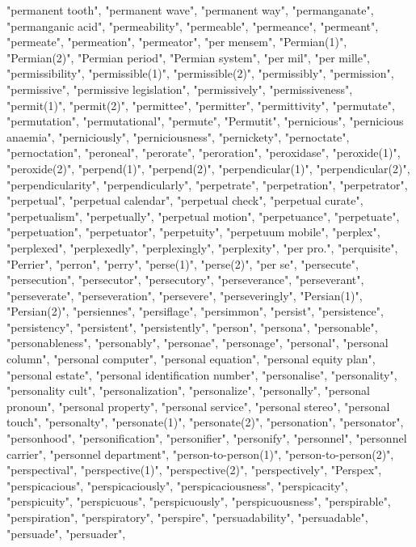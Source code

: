 "permanent tooth",
"permanent wave",
"permanent way",
"permanganate",
"permanganic acid",
"permeability",
"permeable",
"permeance",
"permeant",
"permeate",
"permeation",
"permeator",
"per mensem",
"Permian(1)",
"Permian(2)",
"Permian period",
"Permian system",
"per mil",
"per mille",
"permissibility",
"permissible(1)",
"permissible(2)",
"permissibly",
"permission",
"permissive",
"permissive legislation",
"permissively",
"permissiveness",
"permit(1)",
"permit(2)",
"permittee",
"permitter",
"permittivity",
"permutate",
"permutation",
"permutational",
"permute",
"Permutit",
"pernicious",
"pernicious anaemia",
"perniciously",
"perniciousness",
"pernickety",
"pernoctate",
"pernoctation",
"peroneal",
"perorate",
"peroration",
"peroxidase",
"peroxide(1)",
"peroxide(2)",
"perpend(1)",
"perpend(2)",
"perpendicular(1)",
"perpendicular(2)",
"perpendicularity",
"perpendicularly",
"perpetrate",
"perpetration",
"perpetrator",
"perpetual",
"perpetual calendar",
"perpetual check",
"perpetual curate",
"perpetualism",
"perpetually",
"perpetual motion",
"perpetuance",
"perpetuate",
"perpetuation",
"perpetuator",
"perpetuity",
"perpetuum mobile",
"perplex",
"perplexed",
"perplexedly",
"perplexingly",
"perplexity",
"per pro.",
"perquisite",
"Perrier",
"perron",
"perry",
"perse(1)",
"perse(2)",
"per se",
"persecute",
"persecution",
"persecutor",
"persecutory",
"perseverance",
"perseverant",
"perseverate",
"perseveration",
"persevere",
"perseveringly",
"Persian(1)",
"Persian(2)",
"persiennes",
"persiflage",
"persimmon",
"persist",
"persistence",
"persistency",
"persistent",
"persistently",
"person",
"persona",
"personable",
"personableness",
"personably",
"personae",
"personage",
"personal",
"personal column",
"personal computer",
"personal equation",
"personal equity plan",
"personal estate",
"personal identification number",
"personalise",
"personality",
"personality cult",
"personalization",
"personalize",
"personally",
"personal pronoun",
"personal property",
"personal service",
"personal stereo",
"personal touch",
"personalty",
"personate(1)",
"personate(2)",
"personation",
"personator",
"personhood",
"personification",
"personifier",
"personify",
"personnel",
"personnel carrier",
"personnel department",
"person-to-person(1)",
"person-to-person(2)",
"perspectival",
"perspective(1)",
"perspective(2)",
"perspectively",
"Perspex",
"perspicacious",
"perspicaciously",
"perspicaciousness",
"perspicacity",
"perspicuity",
"perspicuous",
"perspicuously",
"perspicuousness",
"perspirable",
"perspiration",
"perspiratory",
"perspire",
"persuadability",
"persuadable",
"persuade",
"persuader",
